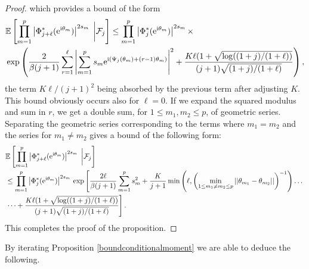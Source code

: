 \documentclass[]{article}
\begin{document}
\begin{proof}
which provides a bound of the form 
\begin{align*}
 &\mathbb{E} \left[ \prod_{m=1}^p \left|\Phi^*_{j+\ell} (\mathrm{e}^{\textnormal{i} \theta_m})
\right|^{2s_m} \;  \bigg| \mathcal{F}_j \right]  \leq \prod_{m=1}^p \left|\Phi^*_{j} (\mathrm{e}^{\textnormal{i} \theta_m})
\right|^{2s_m} \times  \\ &\exp \left( 
\frac{2}{\beta (j+1)} \sum_{r = 1}^{\ell}
\left|\sum_{m=1}^{p} s_m \mathrm{e}^{\textnormal{i} (\Psi_{j} (\theta_m) + (r-1) \theta_m) }\right|^2 
+ \frac{K \ell  (1 + \sqrt{\log((1+j)/(1+\ell))} }{(j+1)\sqrt{(1+j)/(1+\ell)}}
\right),
\end{align*}
the term $K\ell/(j+1)^2$ being absorbed by the previous term after adjusting $K$. 
This bound obviously occurs also for $\ell = 0$. 
If we expand the squared modulus and sum in $r$, we get a double sum, for $1 \leq m_1, m_2 \leq p$, of geometric series. 
Separating the geometric series corresponding to the terms where $m_1 = m_2$ and the series for $m_1 \neq m_2$ gives a bound of the following form:  
\begin{align*}
& \mathbb{E} \left[ \prod_{m=1}^p \left|\Phi^*_{j+\ell} (\mathrm{e}^{\textnormal{i} \theta_m})
\right|^{2s_m} \;  \bigg| \mathcal{F}_j \right]
\\ & \leq \prod_{m=1}^p \left|\Phi^*_{j} (\mathrm{e}^{\textnormal{i} \theta_m})
\right|^{2s_m} \, \exp \left[ 
\frac{2 \ell}{\beta (j+1)}  
 \sum_{m=1}^{p} s_m^2 
+ \frac{K}{j+1} \min \left( \ell, \left(\min_{1 \leq m_1 \neq m_2 \leq p} 
||\theta_{m_1} - \theta_{m_2}|| \right)^{-1} \right)  \dots \right.
\\ & \left.  \dots
+ \frac{K \ell  (1 + \sqrt{\log((1+j)/(1+\ell))} }{(j+1)\sqrt{(1+j)/(1+\ell)}}
\right].
\end{align*}
This completes the proof of the proposition. 
\end{proof}

By iterating Proposition \ref{boundconditionalmoment} we are able to deduce the following.
\end{document}
